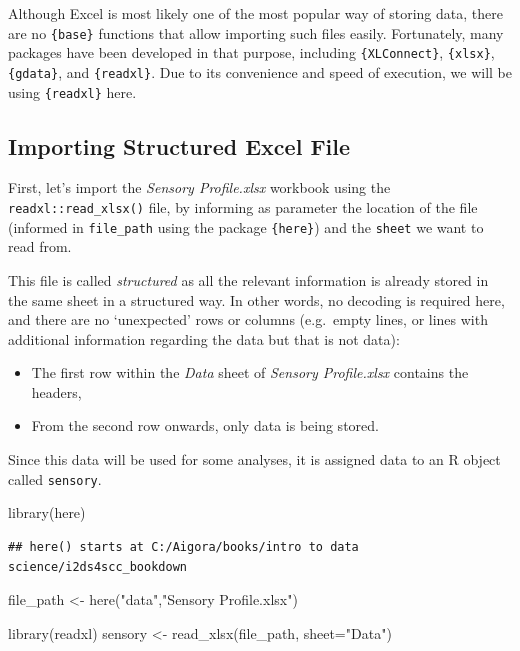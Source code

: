 \documentclass[
]{book}
\newenvironment{Shaded}{\begin{snugshade}}{\end{snugshade}}
\newcommand{\AttributeTok}[1]{\textcolor[rgb]{0.77,0.63,0.00}{#1}}
\newcommand{\FunctionTok}[1]{\textcolor[rgb]{0.00,0.00,0.00}{#1}}
\newcommand{\NormalTok}[1]{#1}
\newcommand{\OtherTok}[1]{\textcolor[rgb]{0.56,0.35,0.01}{#1}}
\newcommand{\StringTok}[1]{\textcolor[rgb]{0.31,0.60,0.02}{#1}}
\providecommand{\tightlist}{%
  \setlength{\itemsep}{0pt}\setlength{\parskip}{0pt}}
\begin{document}
Although Excel is most likely one of the most popular way of storing data, there are no \texttt{\{base\}} functions that allow importing such files easily. Fortunately, many packages have been developed in that purpose, including \texttt{\{XLConnect\}}, \texttt{\{xlsx\}}, \texttt{\{gdata\}}, and \texttt{\{readxl\}}. Due to its convenience and speed of execution, we will be using \texttt{\{readxl\}} here.

\hypertarget{importing-structured-excel-file}{%
\subsection{Importing Structured Excel File}\label{importing-structured-excel-file}}

First, let's import the \emph{Sensory Profile.xlsx} workbook using the \texttt{readxl::read\_xlsx()} file, by informing as parameter the location of the file (informed in \texttt{file\_path} using the package \texttt{\{here\}}) and the \texttt{sheet} we want to read from.

This file is called \emph{structured} as all the relevant information is already stored in the same sheet in a structured way. In other words, no decoding is required here, and there are no `unexpected' rows or columns (e.g.~empty lines, or lines with additional information regarding the data but that is not data):

\begin{itemize}
\tightlist
\item
  The first row within the \emph{Data} sheet of \emph{Sensory Profile.xlsx} contains the headers,\\
\item
  From the second row onwards, only data is being stored.
\end{itemize}

Since this data will be used for some analyses, it is assigned data to an R object called \texttt{sensory}.

\begin{Shaded}
\begin{Highlighting}[]
\FunctionTok{library}\NormalTok{(here)}
\end{Highlighting}
\end{Shaded}

\begin{verbatim}
## here() starts at C:/Aigora/books/intro to data science/i2ds4scc_bookdown
\end{verbatim}

\begin{Shaded}
\begin{Highlighting}[]
\NormalTok{file\_path }\OtherTok{\textless{}{-}} \FunctionTok{here}\NormalTok{(}\StringTok{"data"}\NormalTok{,}\StringTok{"Sensory Profile.xlsx"}\NormalTok{) }

\FunctionTok{library}\NormalTok{(readxl)}
\NormalTok{sensory }\OtherTok{\textless{}{-}} \FunctionTok{read\_xlsx}\NormalTok{(file\_path, }\AttributeTok{sheet=}\StringTok{"Data"}\NormalTok{)}
\end{Highlighting}
\end{Shaded}
\end{document}

